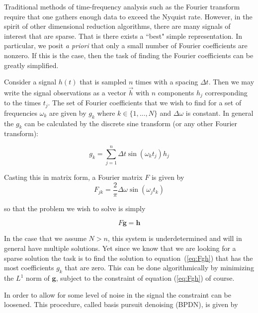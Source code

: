 \documentclass[11pt]{article}
\begin{document}
\par Traditional methods of time-frequency analysis such as the Fourier transform require that one gathers enough data to exceed the Nyquist rate. However, in the spirit of other dimensional reduction algorithms, there are many signals of interest that are sparse. That is there exists a ``best" simple representation. In particular, we posit \textit{a priori} that only a small number of Fourier coefficients are nonzero. If this is the case, then the task of finding the Fourier coefficients can be greatly simplified. \\

\par Consider a signal $h(t)$ that is sampled $n$ times with a spacing $\Delta t$. Then we may write the signal observations as a vector $\vec{h}$ with $n$ components $h_{j}$ corresponding to the times $t_{j}$. The set of Fourier coefficients that we wish to find for a set of frequencies $\omega_{k}$ are given by $g_{k}$ where $k \in \{1,...,N\}$ and $\Delta \omega$ is constant. In general the $g_{k}$ can be calculated by the discrete sine transform (or any other Fourier transform):

\begin{equation}\label{eq:dst}
    g_{k} = \sum_{j=1}^{n} \Delta t \sin(\omega_{k}t_{j})h_{j}
\end{equation}

Casting this in matrix form, a Fourier matrix $F$ is given by
\begin{equation}\label{eq:idst}
    F_{jk} = \frac{2}{\pi}\Delta \omega \sin(\omega_{j}t_{k})
\end{equation}

so that the problem we wish to solve is simply

\begin{equation}\label{eq:Fgh}
    F \mathbf{g} = \mathbf{h}
\end{equation}

In the case that we assume $N > n$, this system is underdetermined and will in general have multiple solutions. Yet since we know that we are looking for a sparse solution the task is to find the solution to equation~(\ref{eq:Fgh}) that has the most coefficients $g_{k}$ that are zero. This can be done algorithmically by minimizing the $L^{1}$ norm of $\mathbf{g}$, subject to the constraint of equation (\ref{eq:Fgh}) of course. \\

\par In order to allow for some level of noise in the signal the constraint can be loosened. This procedure, called basis pursuit denoising (BPDN), is given by
\end{document}

